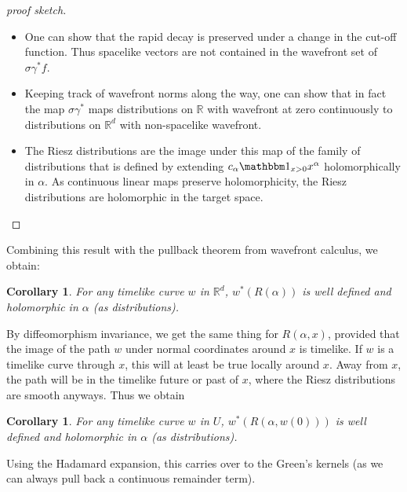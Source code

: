 \documentclass[11pt]{article}
\def\<{\left\langle}
\def\>{\right\rangle}
\def\R{{\mathbb{R}}}
\def\F {\mathcal{F}}
\newtheorem{cor}[df]{Corollary}
\begin{document}
\begin{proof}[proof sketch]
\begin{itemize}
\begin{align*}
		&=-\int\limits_{\R^d}e^{-i\lambda\<x,\xi\>}\psi_\xi(x)\sigma(x)f(\gamma(x))dx\\
		&=-\F(\psi_\xi\sigma\gamma^*(f))(\lambda\xi)\\
		&=0
	\end{align*}
	In particular, the fourier transform of $\psi_\xi \sigma\gamma^*f$ is rapidly decaying on multiples of $\xi$ (being constantly zero).
	\item One can show that the rapid decay is preserved under a change in the cut-off function. Thus spacelike vectors are not contained in the wavefront set of $\sigma\gamma^*f$.
	\item Keeping track of wavefront norms along the way, one can show that in fact the map $\sigma\gamma^*$ maps distributions on $\R$ with wavefront at zero continuously to distributions on $\R^d$ with non-spacelike wavefront.
	\item The Riesz distributions are the image under this map of the family of distributions that is defined by extending $c_\alpha \mathbbm1_{x>0}x^\alpha$ holomorphically in $\alpha$. As continuous linear maps preserve holomorphicity, the Riesz distributions are holomorphic in the target space.
	\end{itemize}
\end{proof}
Combining this result with the pullback theorem from wavefront calculus, we obtain:
\begin{cor}
	For any timelike curve $w$ in $\R^d$, $w^*(R(\alpha))$ is well defined and holomorphic in $\alpha$ (as distributions).
\end{cor}
By diffeomorphism invariance, we get the same thing for $R(\alpha,x)$, provided that the image of the path $w$ under normal coordinates around $x$ is timelike. If $w$ is a timelike curve through $x$, this will at least be true locally around $x$. Away from $x$, the path will be in the timelike future or past of $x$, where the Riesz distributions are smooth anyways. Thus we obtain
\begin{cor}
	\label{Rieszpullback}
	For any timelike curve $w$ in $U$, $w^*(R(\alpha,w(0)))$ is well defined and holomorphic in $\alpha$ (as distributions).
\end{cor}
Using the Hadamard expansion, this carries over to the Green's kernels (as we can always pull back a continuous remainder term).
\end{document}

